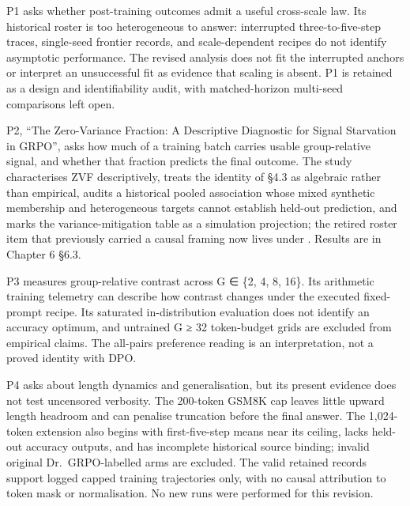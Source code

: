 \documentclass[12pt,a4paper]{report}
\DeclareRobustCommand{\longtok}[1]{\texttt{\seqsplit{#1}}}
\begin{document}
P1 asks whether post-training outcomes admit a useful cross-scale law.
Its historical roster is too heterogeneous to answer: interrupted
three-to-five-step traces, single-seed frontier records, and
scale-dependent recipes do not identify asymptotic performance. The
revised analysis does not fit the interrupted anchors or interpret an
unsuccessful fit as evidence that scaling is absent. P1 is retained as a
design and identifiability audit, with matched-horizon multi-seed
comparisons left open.

P2, ``The Zero-Variance Fraction: A Descriptive Diagnostic for Signal
Starvation in GRPO'', asks how much of a training batch carries usable
group-relative signal, and whether that fraction predicts the final
outcome. The study characterises ZVF descriptively, treats the identity
of §4.3 as algebraic rather than empirical, audits a historical pooled
association whose mixed synthetic membership and heterogeneous targets
cannot establish held-out prediction, and marks the variance-mitigation
table as a simulation projection; the retired roster item that
previously carried a causal framing now lives under
\longtok{archive/absorbed/R02\_\allowbreak{}main\_\allowbreak{}zvf/}. Results are in Chapter 6
§6.3.

P3 measures group-relative contrast across G ∈ \{2, 4, 8, 16\}. Its
arithmetic training telemetry can describe how contrast changes under
the executed fixed-prompt recipe. Its saturated in-distribution
evaluation does not identify an accuracy optimum, and untrained G ≥ 32
token-budget grids are excluded from empirical claims. The all-pairs
preference reading is an interpretation, not a proved identity with DPO.

P4 asks about length dynamics and generalisation, but its present
evidence does not test uncensored verbosity. The 200-token GSM8K cap
leaves little upward length headroom and can penalise truncation before
the final answer. The 1,024-token extension also begins with
first-five-step means near its ceiling, lacks held-out accuracy outputs,
and has incomplete historical source binding; invalid original
Dr.~GRPO-labelled arms are excluded. The valid retained records support
logged capped training trajectories only, with no causal attribution to
token mask or normalisation. No new runs were performed for this
revision.
\end{document}
